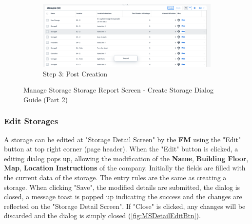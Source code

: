 \begin{figure}[H]
    \ContinuedFloat
    \centering
    
    \begin{subfigure}{0.95\linewidth}
        \includegraphics[width=\linewidth]{images/user_doc/storage/StorageReportPage/createdToast.png}
        \caption{Step 3: Post Creation}
    \end{subfigure}
    
    \caption{Manage Storage Storage Report Screen - Create Storage Dialog Guide (Part 2)}
    \label{fig:MSreportCreateGuide2}
\end{figure}

\subsubsection{Edit Storages}

A storage can be edited at "Storage Detail Screen" by the \textbf{FM} using the "Edit" button at top right corner (page header). 
When the "Edit" button is clicked, a editing dialog pops up, allowing the modification of the \textbf{Name}, \textbf{Building Floor}, \textbf{Map}, \textbf{Location Instructions} of the company. Initially the fields are filled with the current data of the storage. The entry rules are the same as creating a storage.
When clicking "Save", the modified details are submitted, the dialog is closed, a message toast is popped up indicating the success and the changes are reflected on the "Storage Detail Screen". If "Close" is clicked, any changes will be discarded and the dialog is simply closed (\autoref{fig:MSDetailEditBtn}).


